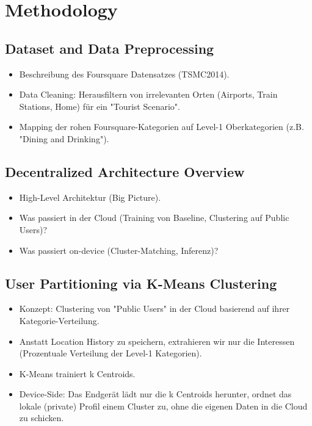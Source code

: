 \documentclass[11pt, a4paper]{article}
\begin{document}
\section{Methodology}
\subsection{Dataset and Data Preprocessing}
\begin{itemize}
    \item Beschreibung des Foursquare Datensatzes (TSMC2014).
    \item Data Cleaning: Herausfiltern von irrelevanten Orten (Airports, Train Stations, Home) für ein "Tourist Scenario".
    \item Mapping der rohen Foursquare-Kategorien auf Level-1 Oberkategorien (z.B. "Dining and Drinking").
\end{itemize}

\subsection{Decentralized Architecture Overview}
\begin{itemize}
    \item High-Level Architektur (Big Picture).
    \item Was passiert in der Cloud (Training von Baseline, Clustering auf Public Users)?
    \item Was passiert on-device (Cluster-Matching, Inferenz)?
\end{itemize}

\subsection{User Partitioning via K-Means Clustering}
\begin{itemize}
    \item Konzept: Clustering von "Public Users" in der Cloud basierend auf ihrer Kategorie-Verteilung.
    \item Anstatt Location History zu speichern, extrahieren wir nur die Interessen (Prozentuale Verteilung der Level-1 Kategorien).
    \item K-Means trainiert k Centroids.
    \item Device-Side: Das Endgerät lädt nur die k Centroids herunter, ordnet das lokale (private) Profil einem Cluster zu, ohne die eigenen Daten in die Cloud zu schicken.
\end{itemize}
\end{document}
